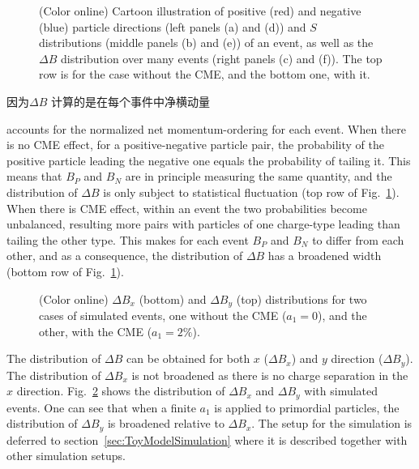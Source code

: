 \begin{figure}[htbp]
\centering
{}
\caption{(Color online) Cartoon illustration of positive (red) and negative (blue) particle directions (left panels (a) and (d)) and $S$ distributions (middle panels (b) and (e)) of an event, as well as the $\Delta B$ distribution over many events (right panels (c) and (f)). The top row is for the case without the CME, and the bottom one, with it.  }
\label{fig:BF_cartoon}
\end{figure}
因为$\Delta B$ 计算的是在每个事件中净横动量

accounts for the normalized net momentum-ordering for each event. When there is no CME effect, for a positive-negative particle pair, the probability of the positive particle leading the negative one equals the probability of tailing it. This means that $B_P$ and $B_N$ are in principle measuring the same quantity, and the distribution of $\Delta B$ is only subject to statistical fluctuation (top row of Fig.~\ref{fig:BF_cartoon}). When there is CME effect, within an event the two probabilities become unbalanced, resulting more pairs with particles of one charge-type leading than tailing the other type. This makes for each event $B_P$ and $B_N$ to differ from each other, and as a consequence, the distribution of $\Delta B$ has a broadened width (bottom row of Fig.~\ref{fig:BF_cartoon}). 

\begin{figure}[htbp]
\centering
{}
\caption{(Color online) $\Delta B_x$ (bottom) and $\Delta B_y$ (top) distributions for two cases of simulated events, one without the CME ($a_1 = 0$), and the other, with the CME ($a_1 = 2\%$). }
\label{fig:BFHisto_lab_example}
\end{figure}

The distribution of $\Delta B$ can be obtained for both $x$ ($\Delta B_{x}$) and $y$ direction ($\Delta B_{y}$). The distribution of $\Delta B_{x}$ is not broadened as there is no charge separation in the $x$ direction. Fig.~\ref{fig:BFHisto_lab_example} shows the distribution of $\Delta B_{x}$ and $\Delta B_{y}$ with simulated events. One can see that when a finite $a_1$ is applied to primordial particles, the distribution of $\Delta B_y$ is broadened relative to $\Delta B_x$. The setup for the simulation is deferred to section~\ref{sec:ToyModelSimulation} where it is described together with other simulation setups.

